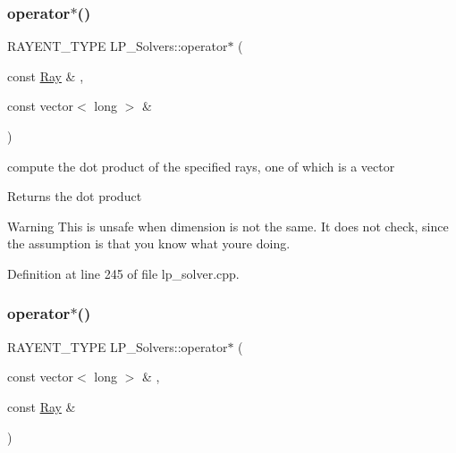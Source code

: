 \subsubsection{\texorpdfstring{operator$\ast$()}{operator*()}\hspace{0.1cm}{\footnotesize\ttfamily [3/6]}}
{\footnotesize\ttfamily R\+A\+Y\+E\+N\+T\+\_\+\+T\+Y\+PE L\+P\+\_\+\+Solvers\+::operator$\ast$ (\begin{DoxyParamCaption}\item[{const \hyperlink{group___c_l_s_solvers_class_l_p___solvers_1_1_ray}{Ray} \&}]{,  }\item[{const vector$<$ long $>$ \&}]{ }\end{DoxyParamCaption})}



compute the dot product of the specified rays, one of which is a vector 

\begin{DoxyReturn}{Returns}
the dot product 
\end{DoxyReturn}
\begin{DoxyWarning}{Warning}
This is unsafe when dimension is not the same. It does not check, since the assumption is that you know what you\textquotesingle{}re doing. 
\end{DoxyWarning}


Definition at line 245 of file lp\+\_\+solver.\+cpp.

\mbox{\label{group___c_l_s_solvers_gab64c33abcc54e5b175b7b567e099c75b}} 
\subsubsection{\texorpdfstring{operator$\ast$()}{operator*()}\hspace{0.1cm}{\footnotesize\ttfamily [4/6]}}
{\footnotesize\ttfamily R\+A\+Y\+E\+N\+T\+\_\+\+T\+Y\+PE L\+P\+\_\+\+Solvers\+::operator$\ast$ (\begin{DoxyParamCaption}\item[{const vector$<$ long $>$ \&}]{,  }\item[{const \hyperlink{group___c_l_s_solvers_class_l_p___solvers_1_1_ray}{Ray} \&}]{ }\end{DoxyParamCaption})}



